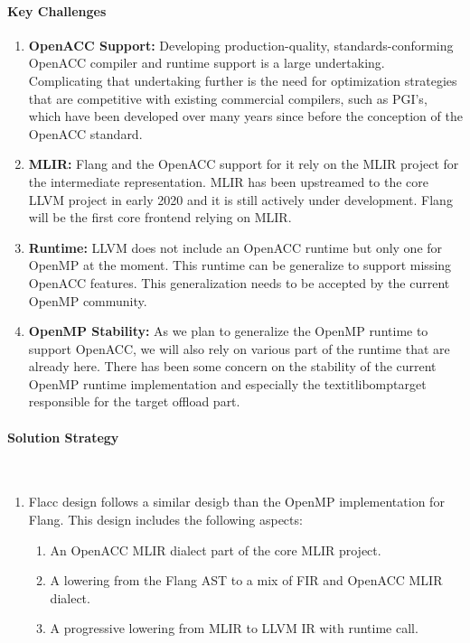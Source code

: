 \paragraph{Key Challenges}

\begin{enumerate}

\item \textbf{OpenACC Support:} Developing production-quality,
      standards-conforming OpenACC compiler and runtime support is a large
      undertaking. Complicating that undertaking further is the need for
      optimization strategies that are competitive with existing commercial
      compilers, such as PGI's, which have been developed over many years
      since before the conception of the OpenACC standard.

\item \textbf{MLIR:} Flang and the OpenACC support for it rely on the MLIR
      project for the intermediate representation. MLIR has been upstreamed to
      the core LLVM project in early 2020 and it is still actively under
      development. Flang will be the first core frontend relying on MLIR.

\item \textbf{Runtime:} LLVM does not include an OpenACC runtime but only one
      for OpenMP at the moment. This runtime can be generalize to support
      missing OpenACC features. This generalization needs to be accepted by the
      current OpenMP community.

\item \textbf{OpenMP Stability:} As we plan to generalize the OpenMP runtime to
      support OpenACC, we will also rely on various part of the runtime that
      are already here. There has been some concern on the stability of the
      current OpenMP runtime implementation and especially the
      textit{libomptarget} responsible for the target offload part.

\end{enumerate}

\paragraph{Solution Strategy}

~
\vspace{-1em}

\begin{enumerate}

\item Flacc design follows a similar desigb than the OpenMP implementation for
      Flang. This design includes the following aspects:

\begin{enumerate}
\item An OpenACC MLIR dialect part of the core MLIR project.
\item A lowering from the Flang AST to a mix of FIR and OpenACC MLIR dialect.
\item A progressive lowering from MLIR to LLVM IR with runtime call.
\end{enumerate}

\end{enumerate}

